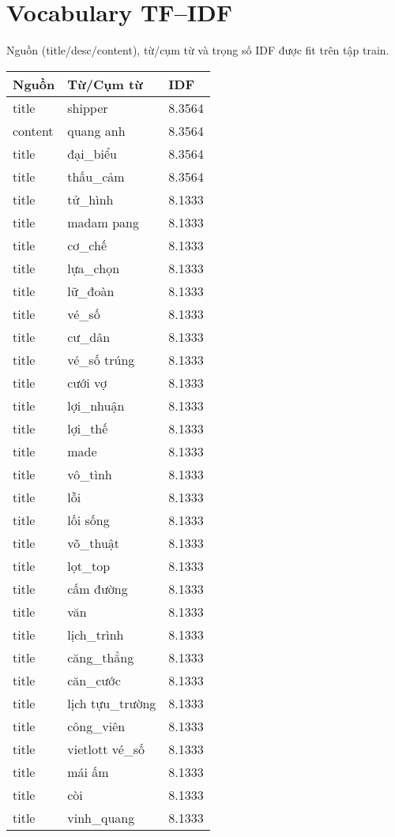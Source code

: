 \documentclass{article}
\begin{document}
\section*{Vocabulary TF--IDF}
\noindent Nguồn (title/desc/content), từ/cụm từ và trọng số IDF được fit trên tập train.\\
\begin{tabular}{lll}
\toprule
Nguồn & Từ/Cụm từ & IDF\\
\midrule
title & shipper & 8.3564\\
content & quang anh & 8.3564\\
title & đại\_biểu & 8.3564\\
title & thấu\_cảm & 8.3564\\
title & tử\_hình & 8.1333\\
title & madam pang & 8.1333\\
title & cơ\_chế & 8.1333\\
title & lựa\_chọn & 8.1333\\
title & lữ\_đoàn & 8.1333\\
title & vé\_số & 8.1333\\
title & cư\_dân & 8.1333\\
title & vé\_số trúng & 8.1333\\
title & cưới vợ & 8.1333\\
title & lợi\_nhuận & 8.1333\\
title & lợi\_thế & 8.1333\\
title & made & 8.1333\\
title & vô\_tình & 8.1333\\
title & lỗi & 8.1333\\
title & lối sống & 8.1333\\
title & võ\_thuật & 8.1333\\
title & lọt\_top & 8.1333\\
title & cấm đường & 8.1333\\
title & văn & 8.1333\\
title & lịch\_trình & 8.1333\\
title & căng\_thẳng & 8.1333\\
title & căn\_cước & 8.1333\\
title & lịch tựu\_trường & 8.1333\\
title & công\_viên & 8.1333\\
title & vietlott vé\_số & 8.1333\\
title & mái ấm & 8.1333\\
title & còi & 8.1333\\
title & vinh\_quang & 8.1333\\

\end{tabular}
\end{document}
